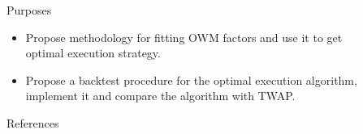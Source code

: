 \documentclass[]{beamer}
\begin{document}
\begin{frame}[t]
\begin{columns}[t]
\begin{column}{\onecolwid}
   
    
    \end{column}
    
    
    \begin{column}{\sepwid}\end{column} %
    
    \begin{column}{\onecolwid} %
    
        
        \begin{block}{Purposes}
        \begin{itemize}
            \item Propose methodology for fitting OWM factors and use it to get optimal execution strategy.
            \item Propose a backtest procedure for the optimal execution algorithm, implement it and compare the algorithm with TWAP.
        \end{itemize}
        
        \end{block}
        
        
        \begin{block}{References}
        
        \printbibliography \vspace{0.75in}
        
        \end{block}
        
        \end{column} %
    
    \begin{column}{\lrmargin}\end{column} %
    
    \end{columns} %
    \end{frame} %
\end{document}
